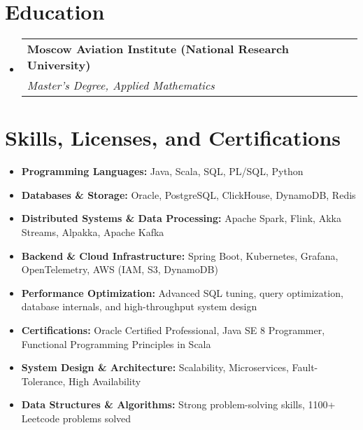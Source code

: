 \documentclass[letterpaper,10.5pt]{article}
\makeatletter
\newcommand{\resumeItem}[1]{
  \item\small{
    {#1 \vspace{-2pt}}
  }
}
\newcommand{\resumeSubheading}[4]{
  \vspace{-2pt}\item
    \begin{tabular*}{0.97\textwidth}[t]{l@{\extracolsep{\fill}}r}
      \textbf{#1} & #2 \\
      \textit{\small#3} & \textit{\small #4} \\
    \end{tabular*}\vspace{-7pt}
}
\newcommand{\resumeSubHeadingListStart}{\begin{itemize}[leftmargin=0.15in, label={}]}
\newcommand{\resumeSubHeadingListEnd}{\end{itemize}}
\newcommand{\resumeItemListStart}{\begin{itemize}}
\newcommand{\resumeItemListEnd}{\end{itemize}\vspace{-5pt}}
\makeatother
\begin{document}
\section{Education}
  \resumeSubHeadingListStart
    \resumeSubheading{Moscow Aviation Institute (National Research University)}{}{Master’s Degree, Applied Mathematics}{}
  \resumeSubHeadingListEnd

  \section{Skills, Licenses, and Certifications}  
  \resumeItemListStart  
    \resumeItem{\textbf{Programming Languages:} Java, Scala, SQL, PL/SQL, Python}  
    \resumeItem{\textbf{Databases \& Storage:} Oracle, PostgreSQL, ClickHouse, DynamoDB, Redis}  
    \resumeItem{\textbf{Distributed Systems \& Data Processing:} Apache Spark, Flink,  Akka Streams, Alpakka, Apache Kafka}  
    \resumeItem{\textbf{Backend \& Cloud Infrastructure:} Spring Boot, Kubernetes, Grafana, OpenTelemetry, AWS (IAM, S3, DynamoDB)}  
    \resumeItem{\textbf{Performance Optimization:} Advanced SQL tuning, query optimization, database internals, and high-throughput system design}  
    \resumeItem{\textbf{Certifications:} Oracle Certified Professional, Java SE 8 Programmer, Functional Programming Principles in Scala}
    \resumeItem{\textbf{System Design \& Architecture:} Scalability, Microservices, Fault-Tolerance, High Availability}  
    \resumeItem{\textbf{Data Structures \& Algorithms:} Strong problem-solving skills, 1100+ Leetcode problems solved} 
  \resumeItemListEnd  
\end{document}
